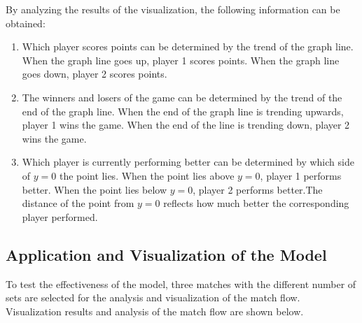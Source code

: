 \documentclass[12pt]{article}  %
\begin{document}
By analyzing the results of the visualization, the following information can be obtained:

\begin{enumerate}[\bfseries 1.]
	\setlength{\parsep}{0ex} %
	\setlength{\topsep}{0.5pt} %
	\setlength{\itemsep}{0.5pt} %
	\item Which player scores points can be determined by the trend of the graph line. When the graph line goes up, player 1 scores points. When the graph line goes down, player 2 scores points.
	
	\item The winners and losers of the game can be determined by the trend of the end of the graph line. When the end of the graph line is trending upwards, player 1 wins the game. When the end of the line is trending down, player 2 wins the game.
	
	\item Which player is currently performing better can be determined by which side of $y=0$ the point lies. When the point lies above $y=0$, player 1 performs better. When the point lies below $y=0$, player 2 performs better.The distance of the point from $y = 0$ reflects how much better the corresponding player performed.
\end{enumerate}

\subsection{Application and Visualization of the Model}
To test the effectiveness of the model, three matches with the different number of sets are selected for the analysis and visualization of the match flow. Visualization results and analysis of the match flow are shown below.
\end{document}

